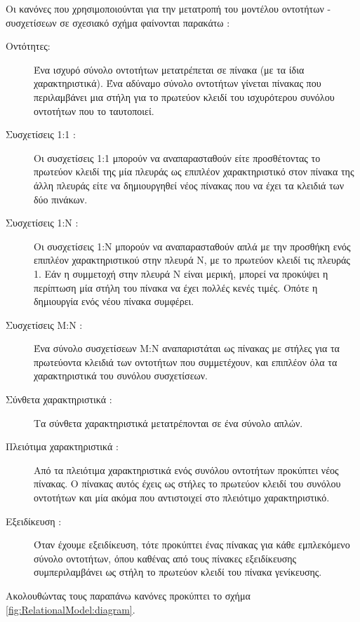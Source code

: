 \documentclass{assignment}
\begin{document}
Οι κανόνες που χρησιμοποιούνται για την μετατροπή του μοντέλου οντοτήτων - συσχετίσεων σε σχεσιακό σχήμα φαίνονται παρακάτω \cite{class_notes}:

\begin{description}

  \item[Οντότητες:] Ένα ισχυρό σύνολο οντοτήτων μετατρέπεται σε πίνακα (με τα ίδια χαρακτηριστικά). Ένα αδύναμο σύνολο οντοτήτων γίνεται πίνακας που περιλαμβάνει μια στήλη για το πρωτεύον κλειδί του ισχυρότερου συνόλου οντοτήτων που το ταυτοποιεί. 
  \item[Συσχετίσεις 1:1 :] Οι συσχετίσεις 1:1 μπορούν να αναπαρασταθούν είτε προσθέτοντας το πρωτεύον κλειδί της μία πλευράς ως επιπλέον χαρακτηριστικό στον πίνακα της άλλη πλευράς είτε να δημιουργηθεί νέος πίνακας που να έχει τα κλειδιά των δύο πινάκων.
  \item[Συσχετίσεις 1:Ν :] Οι συσχετίσεις 1:Ν μπορούν να αναπαρασταθούν απλά με την προσθήκη ενός επιπλέον χαρακτηριστικού στην πλευρά Ν, με το πρωτεύον κλειδί τις πλευράς 1. Εάν η συμμετοχή στην πλευρά Ν είναι μερική, μπορεί να προκύψει η περίπτωση μία στήλη του πίνακα να έχει πολλές κενές τιμές. Οπότε η δημιουργία ενός νέου πίνακα συμφέρει.
  \item[Συσχετίσεις Μ:Ν :] Ένα σύνολο συσχετίσεων M:N αναπαριστάται ως πίνακας με στήλες για τα πρωτεύοντα κλειδιά των οντοτήτων που συμμετέχουν, και επιπλέον όλα τα χαρακτηριστικά του συνόλου συσχετίσεων. 
  \item[Σύνθετα χαρακτηριστικά :] Τα σύνθετα χαρακτηριστικά μετατρέπονται σε ένα σύνολο απλών.
  \item[Πλειότιμα χαρακτηριστικά :] Από τα πλειότιμα χαρακτηριστικά ενός συνόλου οντοτήτων προκύπτει νέος πίνακας. Ο πίνακας αυτός έχεις ως στήλες το πρωτεύον κλειδί του συνόλου οντοτήτων και μία ακόμα που αντιστοιχεί στο πλειότιμο χαρακτηριστικό.
  \item[Εξειδίκευση :] Όταν έχουμε εξειδίκευση, τότε προκύπτει ένας πίνακας για κάθε εμπλεκόμενο σύνολο οντοτήτων, όπου καθένας από τους πίνακες εξειδίκευσης συμπεριλαμβάνει ως στήλη το πρωτεύον κλειδί του πίνακα γενίκευσης.
 
\end{description}

Ακολουθώντας τους παραπάνω κανόνες προκύπτει το σχήμα \ref{fig:RelationalModel:diagram}.
\end{document}
